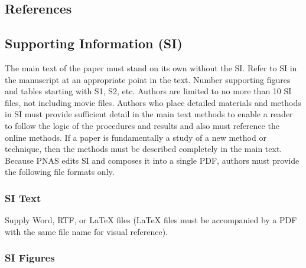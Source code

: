 \documentclass[9pt,twocolumn,twoside]{pnas-new}
\begin{document}
\subsection*{References}



\onecolumn

\subsection*{Supporting Information (SI)}
\FloatBarrier

The main text of the paper must stand on its own without the SI. Refer to SI in the manuscript at an appropriate point in the text. Number supporting figures and tables starting with S1, S2, etc. Authors are limited to no more than 10 SI files, not including movie files. Authors who place detailed materials and methods in SI must provide sufficient detail in the main text methods to enable a reader to follow the logic of the procedures and results and also must reference the online methods. If a paper is fundamentally a study of a new method or technique, then the methods must be described completely in the main text. Because PNAS edits SI and composes it into a single PDF, authors must provide the following file formats only.

\subsubsection*{SI Text}

Supply Word, RTF, or LaTeX files (LaTeX files must be accompanied by a PDF with the same file name for visual reference).

\subsubsection*{SI Figures}
\end{document}
